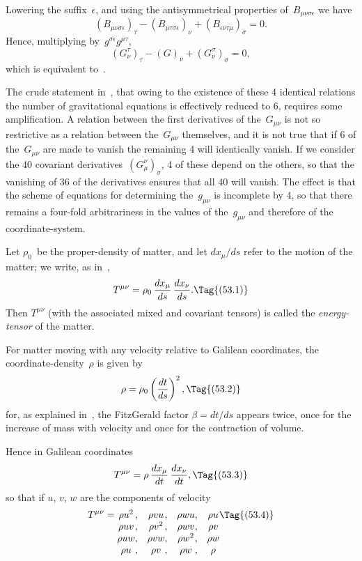 \documentclass[12pt]{book}
\begin{document}
Lowering the suffix~$\epsilon$, and using the antisymmetrical properties of~$B_{\mu\nu\sigma\epsilon}$ we have
\[
(B_{\mu\nu\sigma\epsilon})_\tau - (B_{\mu\tau\sigma\epsilon})_\nu + (B_{\epsilon\nu\tau\mu})_\sigma = 0.
\]
Hence, multiplying by~$g^{\sigma\epsilon}g^{\mu\tau}$,
\[
(G^\tau_\nu)_\tau - (G)_\nu + (G^\sigma_\nu)_\sigma = 0,
\]
which is equivalent to~.

The crude statement in~, that owing to the existence of these 4 identical relations the number of
gravitational equations is effectively reduced to 6, requires some amplification.
A relation between the first derivatives of the~$G_{\mu\nu}$ is not so restrictive as a relation between
the~$G_{\mu\nu}$ themselves, and it is not true that if 6 of the~$G_{\mu\nu}$ are made to vanish the remaining 4 will
identically vanish.
If we consider the 40 covariant derivatives~$(G^\nu_\mu)_\sigma$, 4 of these depend on the others, so that the
vanishing of 36 of the derivatives ensures that all 40 will vanish.
The effect is that the scheme of equations for determining the~$g_{\mu\nu}$ is incomplete by 4,
so that there remains a four-fold arbitrariness in the values of the~$g_{\mu\nu}$ and therefore of
the coordinate\hyp{}system.

%
%

Let $\rho_{0}$~be the proper\hyp{}density of matter, and let $dx_{\mu}/ds$ refer to the motion
of the matter; we write, as in~,
\[
T^{\mu\nu} = \rho_{0}\, \frac{dx_{\mu}}{ds}\, \frac{dx_{\nu}}{ds}.
\Tag{(53.1)}
\]
Then $T^{\mu\nu}$ (with the associated mixed and covariant tensors) is called the
\emph{energy\hyp{}tensor} of the matter.

For matter moving with any velocity relative to Galilean coordinates, the
coordinate\hyp{}density~$\rho$ is given by
\[
\rho = \rho_{0} \left(\frac{dt}{ds}\right)^{2},
\Tag{(53.2)}
\]
for, as explained in~, the FitzGerald factor $\beta = dt/ds$ appears twice, once
for the increase of mass with velocity and once for the contraction of volume.

Hence in Galilean coordinates
\[
T^{\mu\nu} = \rho\, \frac{dx_{\mu}}{dt}\, \frac{dx_{\nu}}{dt},
\Tag{(53.3)}
\]
so that if $u$, $v$, $w$ are the components of velocity
\[
T^{\mu\nu} =
\begin{array}[t]{@{}c@{,\quad}c@{,\quad}c@{,\quad}c@{}}
  \rho u^2 & \rho v u & \rho w u & \rho u\\
  \rho u v & \rho v^2 & \rho w v & \rho v\\
  \rho u w & \rho v w & \rho w^{2} & \rho w\\
  \rho u & \rho v & \rho w & \rho\\
\end{array}
\Tag{(53.4)}
\]
\end{document}
